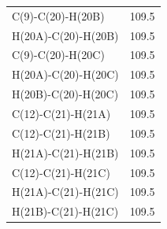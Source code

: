 \begin{center}
{\begin{supertabular}{p{1.5in}c}
C(9)-C(20)-H(20B)&109.5\\
H(20A)-C(20)-H(20B)&109.5\\
C(9)-C(20)-H(20C)&109.5\\
H(20A)-C(20)-H(20C)&109.5\\
H(20B)-C(20)-H(20C)&109.5\\
C(12)-C(21)-H(21A)&109.5\\
C(12)-C(21)-H(21B)&109.5\\
H(21A)-C(21)-H(21B)&109.5\\
C(12)-C(21)-H(21C)&109.5\\
H(21A)-C(21)-H(21C)&109.5\\
H(21B)-C(21)-H(21C)&109.5\\
\end{supertabular}
}
\end{center}

